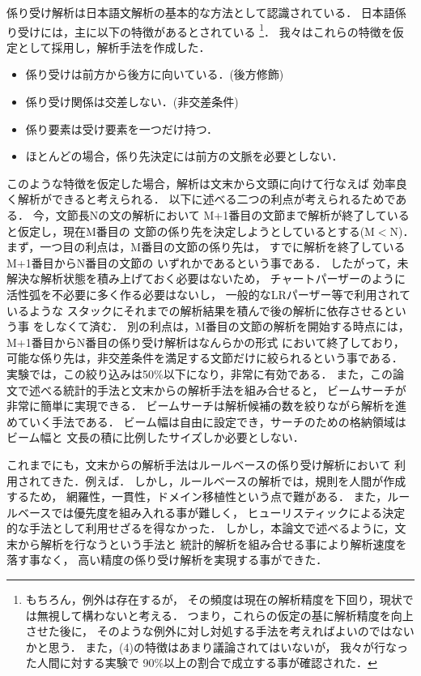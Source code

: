係り受け解析は日本語文解析の基本的な方法として認識されている．
日本語係り受けには，主に以下の特徴があるとされている
\footnote{もちろん，例外は存在するが\cite{sshirai:jnlp98}，
その頻度は現在の解析精度を下回り，現状では無視して構わないと考える．
つまり，これらの仮定の基に解析精度を向上させた後に，
そのような例外に対し対処する手法を考えればよいのではないかと思う．
また，(4)の特徴はあまり議論されてはいないが，
我々が行なった人間に対する実験で
90\%以上の割合で成立する事が確認された．}．
我々はこれらの特徴を仮定として採用し，解析手法を作成した．
\begin{itemize}
\item[(1)] 係り受けは前方から後方に向いている．(後方修飾)
\item[(2)] 係り受け関係は交差しない．(非交差条件)
\item[(3)] 係り要素は受け要素を一つだけ持つ．
\item[(4)] ほとんどの場合，係り先決定には前方の文脈を必要としない．
\end{itemize}
このような特徴を仮定した場合，解析は文末から文頭に向けて行なえば
効率良く解析ができると考えられる．
以下に述べる二つの利点が考えられるためである．
今，文節長Nの文の解析において
M+1番目の文節まで解析が終了していると仮定し，現在M番目の
文節の係り先を決定しようとしているとする(M$<$N)．
まず，一つ目の利点は，M番目の文節の係り先は，
すでに解析を終了しているM+1番目からN番目の文節の
いずれかであるという事である．
したがって，未解決な解析状態を積み上げておく必要はないため，
チャートパーザーのように活性弧を不必要に多く作る必要はないし，
一般的なLRパーザー等で利用されているような
スタックにそれまでの解析結果を積んで後の解析に依存させるという事
をしなくて済む．
別の利点は，M番目の文節の解析を開始する時点には，
M+1番目からN番目の係り受け解析はなんらかの形式
において終了しており，
可能な係り先は，非交差条件を満足する文節だけに絞られるという事である．
実験では，この絞り込みは50\%以下になり，非常に有効である．
また，この論文で述べる統計的手法と文末からの解析手法を組み合せると，
ビームサーチが非常に簡単に実現できる．
ビームサーチは解析候補の数を絞りながら解析を進めていく手法である．
ビーム幅は自由に設定でき，サーチのための格納領域はビーム幅と
文長の積に比例したサイズしか必要としない．

これまでにも，文末からの解析手法はルールベースの係り受け解析において
利用されてきた．例えば\cite{fujita:ai88}．
しかし，ルールベースの解析では，規則を人間が作成するため，
網羅性，一貫性，ドメイン移植性という点で難がある．
また，ルールベースでは優先度を組み入れる事が難しく，
ヒューリスティックによる決定的な手法として利用せざるを得なかった．
しかし，本論文で述べるように，文末から解析を行なうという手法と
統計的解析を組み合せる事により解析速度を落す事なく，
高い精度の係り受け解析を実現する事ができた．

